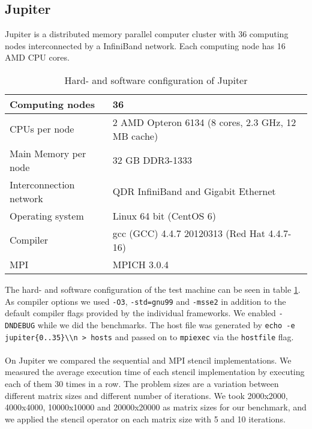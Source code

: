 \documentclass[11pt,a4paper]{article}
\begin{document}
\subsection{Jupiter} \label{subsec:jupiter}
Jupiter is a distributed memory parallel computer cluster with 36 computing nodes interconnected by a InfiniBand network. Each computing node has 16 AMD CPU cores.

\begin{table}[H]
  \label{tab:jupiter} 
  \caption{Hard- and software configuration of Jupiter}
  \begin{center}
    \begin{tabular}{|l|l|}
      \hline
      Computing nodes & 36\\\hline
      CPUs per node & 2 AMD Opteron 6134 (8 cores, 2.3 GHz, 12 MB cache)\\\hline
      Main Memory per node & 32 GB DDR3-1333\\\hline
      Interconnection network & QDR InfiniBand and Gigabit Ethernet\\\hline
      Operating system & Linux 64 bit (CentOS 6)\\\hline
      Compiler & gcc (GCC) 4.4.7 20120313 (Red Hat 4.4.7-16)\\\hline
      MPI & MPICH 3.0.4\\\hline
    \end{tabular}    
  \end{center}
\end{table}

\noindent The hard- and software configuration of the test machine can be seen in table \ref{tab:jupiter}. As compiler options we used \verb|-O3|, \verb|-std=gnu99| and \verb|-msse2| in addition to the default compiler flags provided by the individual frameworks. We enabled \verb|-DNDEBUG| while we did the benchmarks. The host file was generated by \verb|echo -e jupiter{0..35}\\n > hosts| and passed on to \verb|mpiexec| via the \verb|hostfile| flag.\\
\\
On Jupiter we compared the sequential and MPI stencil implementations. We measured the average execution time of each stencil implementation by executing each of them 30 times in a row. The problem sizes are a variation between different matrix sizes and different number of iterations. We took 2000x2000, 4000x4000, 10000x10000 and 20000x20000 as matrix sizes for our benchmark, and we applied the stencil operator on each matrix size with 5 and 10 iterations.
\end{document}
